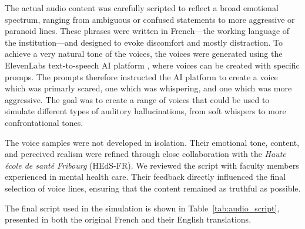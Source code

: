 \vspace{1em}
The actual audio content was carefully scripted to reflect a broad emotional spectrum, ranging from ambiguous or confused statements to more aggressive or paranoid lines. These phrases were written in French—the working language of the institution—and designed to evoke discomfort and mostly distraction. To achieve a very natural tone of the voices, the voices were generated using the ElevenLabs text-to-speech AI platform \cite{elevenlabs}, where voices can be created with specific promps. The prompts therefore instructed the AI platform to create a voice which was primarly scared, one which was whispering, and one which was more aggressive. The goal was to create a range of voices that could be used to simulate different types of auditory hallucinations, from soft whispers to more confrontational tones.

The voice samples were not developed in isolation. Their emotional tone, content, and perceived realism were refined through close collaboration with the \textit{Haute école de santé Fribourg} (HEdS-FR). We reviewed the script with faculty members experienced in mental health care. Their feedback directly influenced the final selection of voice lines, ensuring that the content remained as truthful as possible. 

\vspace{1em}
The final script used in the simulation is shown in Table~\ref{tab:audio_script}, presented in both the original French and their English translations.

